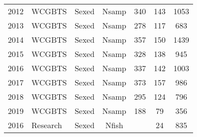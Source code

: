 \begin{longtable}[t]{c>{\centering\arraybackslash}p{3cm}ccccc}
2012 & WCGBTS & Sexed & Nsamp & 340 & 143 & 1053\\
2013 & WCGBTS & Sexed & Nsamp & 278 & 117 & 683\\
2014 & WCGBTS & Sexed & Nsamp & 357 & 150 & 1439\\
2015 & WCGBTS & Sexed & Nsamp & 328 & 138 & 945\\
2016 & WCGBTS & Sexed & Nsamp & 337 & 142 & 1003\\
2017 & WCGBTS & Sexed & Nsamp & 373 & 157 & 986\\
2018 & WCGBTS & Sexed & Nsamp & 295 & 124 & 796\\
2019 & WCGBTS & Sexed & Nsamp & 188 & 79 & 356\\
2016 & Research & Sexed & Nfish &  & 24 & 835\\*
\end{longtable}
\endgroup{}
\endgroup{}
